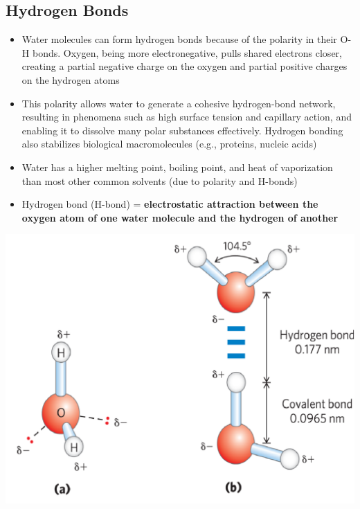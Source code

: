 \documentclass[10pt]{article}
\begin{document}
\subsection*{Hydrogen Bonds}
\begin{itemize}
    \item Water molecules can form hydrogen bonds because of the polarity in their O-H bonds.  Oxygen, being more electronegative, pulls shared electrons closer, creating a partial negative charge on the oxygen and partial positive charges on the hydrogen atoms
    \item This polarity allows water to generate a cohesive hydrogen-bond network, resulting in phenomena such as high surface tension and capillary action, and enabling it to dissolve many polar substances effectively.  Hydrogen bonding also stabilizes biological macromolecules (e.g., proteins, nucleic acids)
    \item Water has a higher melting point, boiling point, and heat of vaporization than most other common solvents (due to polarity and H-bonds)
    \item Hydrogen bond (H-bond) = \textbf{electrostatic attraction between the oxygen atom of one water molecule and the hydrogen of another}
\end{itemize}
\begin{center}
    \includegraphics[scale=0.5]{L2_2.png}
\end{center}
\end{document}
